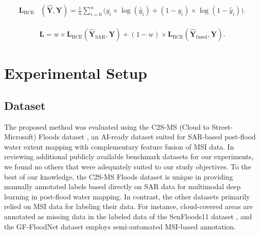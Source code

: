 \documentclass[preprint,12pt,authoryear]{elsarticle}
\begin{document}

\begin{equation}
\label{eq8}
    \begin{aligned}
        \mathbf{L}_{\text{BCE}} &(\hat{\mathbf{Y}}, \mathbf{Y}) = \frac{1}{n} \sum_{i=0}^n \Big(y_i \times \log (\hat{y}_i) + (1 - y_i) \times \log (1 - \hat{y}_i)\Big).
    \end{aligned}
\end{equation}

\begin{equation}
\label{eq9}
    \begin{aligned}
        \mathbf{L} = w \times \mathbf{L}_{\text{BCE}}(\hat{\mathbf{Y}}_{\text{SAR}}, \mathbf{Y}) + (1-w) \times \mathbf{L}_{\text{BCE}}(\hat{\mathbf{Y}}_{\text{fused}}, \mathbf{Y}).
    \end{aligned}
\end{equation}

\section{Experimental Setup}
\label{Section4}

\subsection{Dataset}
\label{Section4.1}

The proposed method was evaluated using the C2S-MS (Cloud to Street-Microsoft) Floods dataset \citep{Cloud_to_Street2022}, an AI-ready dataset suited for SAR-based post-flood water extent mapping with complementary feature fusion of MSI data. In reviewing additional publicly available benchmark datasets for our experiments, we found no others that were adequately suited to our study objectives. To the best of our knowledge, the C2S-MS Floods dataset is unique in providing manually annotated labels based directly on SAR data for multimodal deep learning in post-flood water mapping. In contrast, the other datasets primarily relied on MSI data for labeling their data. For instance, cloud-covered areas are annotated as missing data in the labeled data of the SenFloods11 dataset \citep{bonafilia2020sen1floods11}, and the GF-FloodNet dataset \citep{zhang2023new} employs semi-automated MSI-based annotation.
\end{document}
